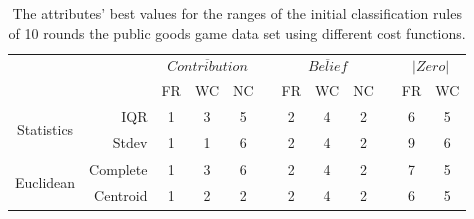 \begin{table}[!h]
    
    \small
    \centering

    \caption{The attributes' best values for the ranges of the initial classification rules of 10 rounds the public goods game data set using different cost functions.}
    \label{tab:bestPGG10DataSets}
    \begin{tabular}{@{}crcccccccccc@{}}
        \toprule
        &    & \multicolumn{3}{c}{\textbf{$\overline{Contribution}$}} &  \phantom{abc}& \multicolumn{3}{c}{\textbf{$\overline{Belief}$}} &  \phantom{abc}& \multicolumn{2}{c}{\textbf{$\left |Zero\right |$}} \\
        
        \cmidrule{3-5} \cmidrule{7-9} \cmidrule{11-12}
        
        &    & FR                & WC                & NC    & \phantom{abc}           & FR              & WC              & NC     & \phantom{abc}        & FR                        & WC                        \\ \midrule
        
        
        \multirow{2}{*}{\begin{turn}{90}{\scriptsize Statistics}\end{turn}}    
        & IQR & 
        1    & 3   & 5 & \phantom{abc}           
        & 2  & 4   & 2 & \phantom{abc}        
        & 6   & 5                         \\
        
        &Stdev & 
        1   & 1   & 6 & \phantom{abc}           
        & 2  & 4  & 2  & \phantom{abc}       
        & 9  & 6\\
        
        \midrule
            
        \multirow{2}{*}{\begin{turn}{90}{\scriptsize Euclidean}\end{turn}}
        &Complete & 
          1  & 3  & 6   & \phantom{abc}           
        & 2  & 4  & 2   & \phantom{abc}        
        & 7  & 5                         \\
        
        &Centroid & 
          1  & 2  & 2  & \phantom{abc}           
        & 2  & 4  & 2       & \phantom{abc}       
        & 6  & 5\\
        
        
        \midrule


\end{tabular}
\end{table}
